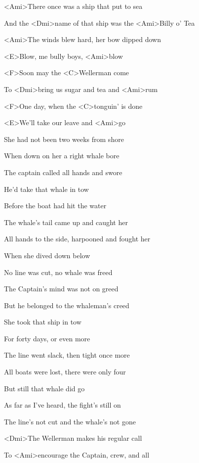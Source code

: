 

\zs
<Ami>There once was a ship that put to sea

And the <Dmi>name of that ship was the <Ami>Billy o' Tea

<Ami>The winds blew hard, her bow dipped down

<E>Blow, me bully boys, <Ami>blow
\ks

\zr
<F>Soon may the <C>Wellerman come

To <Dmi>bring us sugar and tea and <Ami>rum

<F>One day, when the <C>tonguin' is done

<E>We'll take our leave and <Ami>go
\kr

\zs
She had not been two weeks from shore

When down on her a right whale bore

The captain called all hands and swore

He'd take that whale in tow
\ks

\zr \kr

\zs
Before the boat had hit the water

The whale's tail came up and caught her

All hands to the side, harpooned and fought her

When she dived down below
\ks

\zr \kr

\zs
No line was cut, no whale was freed

The Captain's mind was not on greed

But he belonged to the whaleman's creed

She took that ship in tow
\ks

\zr \kr

\zs
For forty days, or even more

The line went slack, then tight once more

All boats were lost, there were only four

But still that whale did go
\ks

\zr \kr

\zs
As far as I've heard, the fight's still on

The line's not cut and the whale's not gone

<Dmi>The Wellerman makes his regular call

To <Ami>encourage the Captain, crew, and all
\ks

\zr \kr

\kp
